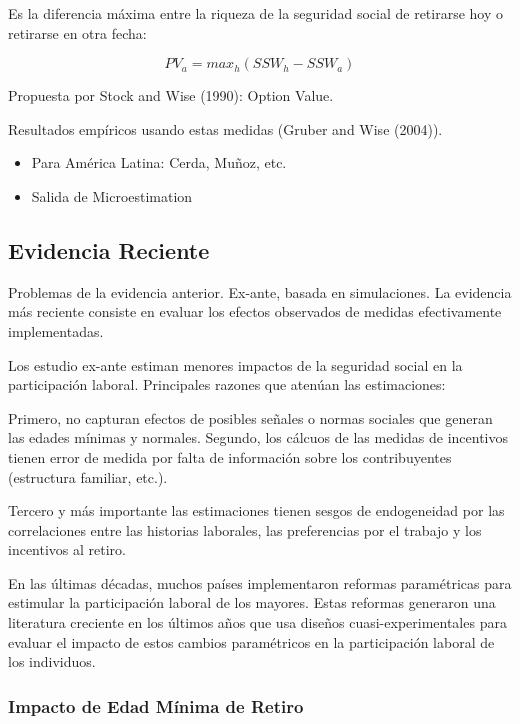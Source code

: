 \documentclass[]{article}
\providecommand{\tightlist}{%
  \setlength{\itemsep}{0pt}\setlength{\parskip}{0pt}}
\begin{document}
Es la diferencia máxima entre la riqueza de la seguridad social de
retirarse hoy o retirarse en otra fecha:

\[ PV_{a} = max_{h}(SSW_{h}-SSW_{a}) \]

Propuesta por Stock and Wise (1990): Option Value.

Resultados empíricos usando estas medidas (Gruber and Wise (2004)).

\begin{itemize}
\tightlist
\item
  Para América Latina: Cerda, Muñoz, etc.
\end{itemize}

\begin{itemize}
\tightlist
\item
  Salida de Microestimation
\end{itemize}

\subsection{Evidencia Reciente}\label{evidencia-reciente}

Problemas de la evidencia anterior. Ex-ante, basada en simulaciones. La
evidencia más reciente consiste en evaluar los efectos observados de
medidas efectivamente implementadas.

Los estudio ex-ante estiman menores impactos de la seguridad social en
la participación laboral. Principales razones que atenúan las
estimaciones:

Primero, no capturan efectos de posibles señales o normas sociales que
generan las edades mínimas y normales. Segundo, los cálcuos de las
medidas de incentivos tienen error de medida por falta de información
sobre los contribuyentes (estructura familiar, etc.).

Tercero y más importante las estimaciones tienen sesgos de endogeneidad
por las correlaciones entre las historias laborales, las preferencias
por el trabajo y los incentivos al retiro.

En las últimas décadas, muchos países implementaron reformas
paramétricas para estimular la participación laboral de los mayores.
Estas reformas generaron una literatura creciente en los últimos años
que usa diseños cuasi-experimentales para evaluar el impacto de estos
cambios paramétricos en la participación laboral de los individuos.

\subsubsection{Impacto de Edad Mínima de
Retiro}\label{impacto-de-edad-minima-de-retiro}
\end{document}
